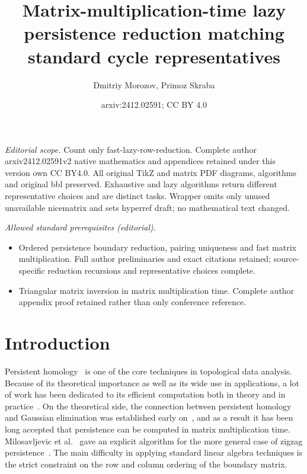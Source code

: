 \documentclass[10pt,a4paper]{article}
\title{Matrix-multiplication-time lazy persistence reduction matching standard cycle representatives}
\author{Dmitriy Morozov, Primoz Skraba}
\date{arxiv:2412.02591; CC BY 4.0}
\begin{document}
\maketitle
\noindent\textit{Editorial scope.} Count only fast-lazy-row-reduction. Complete author arxiv2412.02591v2 native mathematics and appendices retained under this version own CC BY4.0. All original TikZ and matrix PDF diagrams, algorithms and original bbl preserved. Exhaustive and lazy algorithms return different representative choices and are distinct tasks. Wrapper omits only unused unavailable nicematrix and sets hyperref draft; no mathematical text changed.\par\medskip
\noindent\textit{Allowed standard prerequisites (editorial).}\begin{itemize}
\item Ordered persistence boundary reduction, pairing uniqueness and fast matrix multiplication. Full author preliminaries and exact citations retained; source-specific reduction recursions and representative choices complete.
\item Triangular matrix inversion in matrix multiplication time. Complete author appendix proof retained rather than only conference reference.
\end{itemize}\medskip
\section{Introduction}

Persistent homology~\cite{edelsbrunner2002topological} is one of the core techniques in topological data analysis. Because of its theoretical importance as well as its wide use in applications, a lot of work has been dedicated to its efficient computation both in theory \cite{milosavljevic2011zigzag,de2011dualities,chen2011output,busaryev2012annotating,kerber2016persistent} and in practice~\cite{bauer2014clear,bauer2017phat,bauer2021ripser,hylton2017performance,henselmanghristl6,wagner2011efficient}.
On the theoretical side, the connection between persistent homology and Gaussian elimination was established early on~\cite{zomorodian2004computing}, and as a result it has been long accepted that persistence can be computed in matrix multiplication time. Milosavljevic et al.~\cite{milosavljevic2011zigzag} gave an explicit algorithm for the more general case of zigzag persistence~\cite{CdS10,CdSM09}. The main difficulty in applying standard linear algebra techniques is the strict constraint on the row and column ordering of the boundary matrix. 
\end{document}

